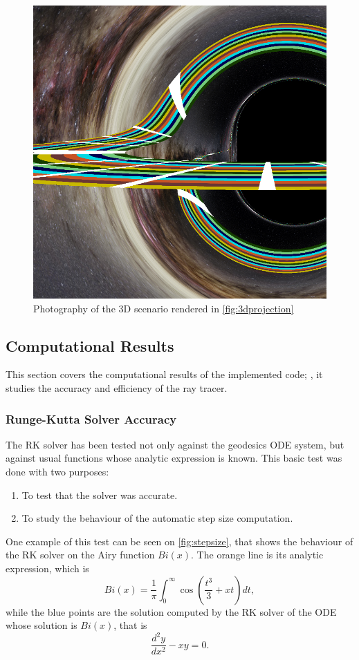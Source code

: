 \begin{figure}[bth]
	\myfloatalign
	\includegraphics[width=.7\linewidth]{gfx/3d_01_image}
	\caption[Photography from a 3D scenario]{Photography of the 3D scenario rendered in \autoref{fig:3dprojection}}
	\label{fig:3dprojectionimage}
\end{figure}

\subsection{Computational Results}

This section covers the computational results of the implemented code; \ie, it studies the accuracy and efficiency of the ray tracer.

\subsubsection*{Runge-Kutta Solver Accuracy}

The \ac{RK} solver has been tested not only against the geodesics \ac{ODE} system, but against usual functions whose analytic expression is known. This basic test was done with two purposes:
\begin{enumerate}
	\item To test that the solver was accurate.
	\item To study the behaviour of the automatic step size computation.
\end{enumerate}

One example of this test can be seen on \autoref{fig:stepsize}, that shows the behaviour of the \ac{RK} solver on the Airy function $Bi(x)$. The orange line is its analytic expression, which is
\[
Bi(x) = \frac{1}{\pi} \int_0^\infty \cos\left(\frac{t^3}{3} + xt\right)dt,
\]
while the blue points are the solution computed by the \ac{RK} solver of the \ac{ODE} whose solution is $Bi(x)$, that is
\[
\frac{d^2y}{dx^2} - xy = 0.
\]


